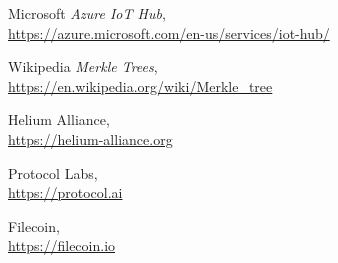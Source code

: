 \documentclass[a4paper,12pt]{article}
\begin{document}
\begin{thebibliography}{9}
	Microsoft
		\textit{Azure IoT Hub}, \\
		\url{https://azure.microsoft.com/en-us/services/iot-hub/}

	Wikipedia
		\textit{Merkle Trees}, \\
		\url{https://en.wikipedia.org/wiki/Merkle_tree}

	Helium Alliance, \\
		\url{https://helium-alliance.org}

	Protocol Labs, \\
		\url{https://protocol.ai}

	Filecoin, \\
		\url{https://filecoin.io}

\end{thebibliography}
\end{document}
